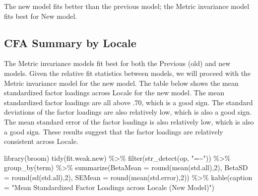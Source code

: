 \documentclass[
  letterpaper,
  DIV=11,
  numbers=noendperiod]{scrartcl}
\newenvironment{Shaded}{\begin{snugshade}}{\end{snugshade}}
\newcommand{\AttributeTok}[1]{\textcolor[rgb]{0.40,0.45,0.13}{#1}}
\newcommand{\DecValTok}[1]{\textcolor[rgb]{0.68,0.00,0.00}{#1}}
\newcommand{\FunctionTok}[1]{\textcolor[rgb]{0.28,0.35,0.67}{#1}}
\newcommand{\NormalTok}[1]{\textcolor[rgb]{0.00,0.23,0.31}{#1}}
\newcommand{\SpecialCharTok}[1]{\textcolor[rgb]{0.37,0.37,0.37}{#1}}
\newcommand{\StringTok}[1]{\textcolor[rgb]{0.13,0.47,0.30}{#1}}
\begin{document}
The new model fits better than the previous model; the Metric invariance
model fits best for New model.

\subsection{CFA Summary by Locale}\label{cfa-summary-by-locale}

The Metric invariance models fit best for both the Previous (old) and
new models. Given the relative fit statistics between models, we will
proceed with the Metric invariance model for the new model. The table
below shows the mean standardized factor loadings across Locale for the
new model. The mean standardized factor loadings are all above .70,
which is a good sign. The standard deviations of the factor loadings are
also relatively low, which is also a good sign. The mean standard error
of the factor loadings is also relatively low, which is also a good
sign. These results suggest that the factor loadings are relatively
consistent across Locale.

\begin{Shaded}
\begin{Highlighting}[]
\FunctionTok{library}\NormalTok{(broom)}
\FunctionTok{tidy}\NormalTok{(fit.weak.new) }\SpecialCharTok{\%\textgreater{}\%}
  \FunctionTok{filter}\NormalTok{(}\FunctionTok{str\_detect}\NormalTok{(op, }\StringTok{"=\textasciitilde{}"}\NormalTok{)) }\SpecialCharTok{\%\textgreater{}\%}
  \FunctionTok{group\_by}\NormalTok{(term) }\SpecialCharTok{\%\textgreater{}\%}
  \FunctionTok{summarize}\NormalTok{(}\AttributeTok{BetaMean =} \FunctionTok{round}\NormalTok{(}\FunctionTok{mean}\NormalTok{(std.all),}\DecValTok{2}\NormalTok{), }
            \AttributeTok{BetaSD =} \FunctionTok{round}\NormalTok{(}\FunctionTok{sd}\NormalTok{(std.all),}\DecValTok{2}\NormalTok{), }
            \AttributeTok{SEMean =} \FunctionTok{round}\NormalTok{(}\FunctionTok{mean}\NormalTok{(std.error),}\DecValTok{2}\NormalTok{)) }\SpecialCharTok{\%\textgreater{}\%}
  \FunctionTok{kable}\NormalTok{(}\AttributeTok{caption =} \StringTok{"Mean Standardized Factor Loadings across Locale (New Model)"}\NormalTok{)}
\end{Highlighting}
\end{Shaded}
\end{document}
